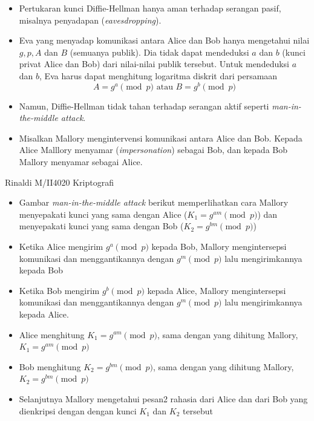 \documentclass{article}
\begin{document}
\begin{itemize}
    \item Pertukaran kunci Diffie-Hellman hanya aman terhadap serangan pasif, misalnya penyadapan (\textit{eavesdropping}).
    \item Eva yang menyadap komunikasi antara Alice dan Bob hanya mengetahui nilai $g, p, A$ dan $B$ (semuanya publik). Dia tidak dapat mendeduksi $a$ dan $b$ (kunci privat Alice dan Bob) dari nilai-nilai publik tersebut. Untuk mendeduksi $a$ dan $b$, Eva harus dapat menghitung logaritma diskrit dari persamaan
    \[ A = g^a \pmod{p} \text{ atau } B = g^b \pmod{p} \]
    \item Namun, Diffie-Hellman tidak tahan terhadap serangan aktif seperti \textit{man-in-the-middle attack}.
    \item Misalkan Mallory mengintervensi komunikasi antara Alice dan Bob. Kepada Alice Malllory menyamar (\textit{impersonation}) sebagai Bob, dan kepada Bob Mallory menyamar sebagai Alice.
\end{itemize}

\vfill
\begin{center}
    Rinaldi M/II4020 Kriptografi
\end{center}

\newpage


\begin{itemize}
    \item Gambar \textit{man-in-the-middle attack} berikut memperlihatkan cara Mallory menyepakati kunci yang sama dengan Alice ($K_1 = g^{am} \pmod{p}$) dan menyepakati kunci yang sama dengan Bob ($K_2 = g^{bm} \pmod{p}$)
    \vspace{40mm}
    \item Ketika Alice mengirim $g^a \pmod{p}$ kepada Bob, Mallory mengintersepsi komunikasi dan menggantikannya dengan $g^m \pmod{p}$ lalu mengirimkannya kepada Bob
    \item Ketika Bob mengirim $g^b \pmod{p}$ kepada Alice, Mallory mengintersepsi komunikasi dan menggantikannya dengan $g^m \pmod{p}$ lalu mengirimkannya kepada Alice.
    \item Alice menghitung $K_1 = g^{am} \pmod{p}$, sama dengan yang dihitung Mallory, $K_1 = g^{am} \pmod{p}$
    \item Bob menghitung $K_2 = g^{bm} \pmod{p}$, sama dengan yang dihitung Mallory, $K_2 = g^{bm} \pmod{p}$
    \item Selanjutnya Mallory mengetahui pesan2 rahasia dari Alice dan dari Bob yang dienkripsi dengan dengan kunci $K_1$ dan $K_2$ tersebut
\end{itemize}
\end{document}
